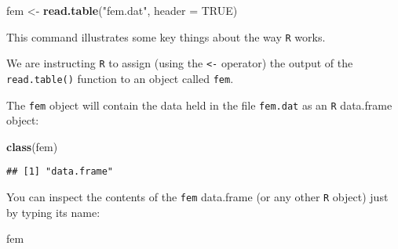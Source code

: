 \documentclass[]{book}
\newenvironment{Shaded}{\begin{snugshade}}{\end{snugshade}}
\newcommand{\KeywordTok}[1]{\textcolor[rgb]{0.13,0.29,0.53}{\textbf{#1}}}
\newcommand{\DataTypeTok}[1]{\textcolor[rgb]{0.13,0.29,0.53}{#1}}
\newcommand{\StringTok}[1]{\textcolor[rgb]{0.31,0.60,0.02}{#1}}
\newcommand{\OtherTok}[1]{\textcolor[rgb]{0.56,0.35,0.01}{#1}}
\newcommand{\NormalTok}[1]{#1}
\theoremstyle{definition}
\theoremstyle{definition}
\theoremstyle{definition}
\theoremstyle{remark}
\begin{document}
\begin{Shaded}
\begin{Highlighting}[]
\NormalTok{fem <-}\StringTok{ }\KeywordTok{read.table}\NormalTok{(}\StringTok{"fem.dat"}\NormalTok{, }\DataTypeTok{header =} \OtherTok{TRUE}\NormalTok{)}
\end{Highlighting}
\end{Shaded}

This command illustrates some key things about the way \texttt{R} works.

We are instructing \texttt{R} to assign (using the \texttt{\textless{}-}
operator) the output of the \texttt{read.table()} function to an object
called \texttt{fem}.

The \texttt{fem} object will contain the data held in the file
\texttt{fem.dat} as an \texttt{R} data.frame object:

\begin{Shaded}
\begin{Highlighting}[]
\KeywordTok{class}\NormalTok{(fem)}
\end{Highlighting}
\end{Shaded}

\begin{verbatim}
## [1] "data.frame"
\end{verbatim}

You can inspect the contents of the \texttt{fem} data.frame (or any
other \texttt{R} object) just by typing its name:

\begin{Shaded}
\begin{Highlighting}[]
\NormalTok{fem}
\end{Highlighting}
\end{Shaded}
\end{document}
